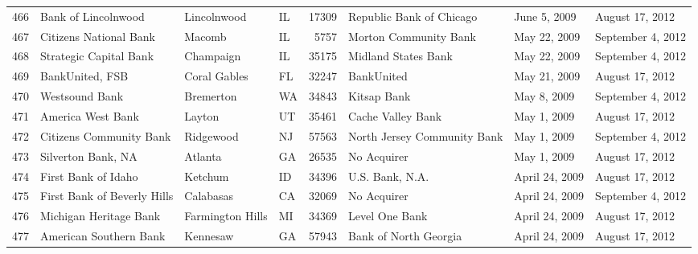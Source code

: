 \begin{tabular}{llllrlll}
466 &                                Bank of Lincolnwood &         Lincolnwood &  IL &  17309 &                           Republic Bank of Chicago &        June 5, 2009 &     August 17, 2012 \\
467 &                             Citizens National Bank &              Macomb &  IL &   5757 &                              Morton Community Bank &        May 22, 2009 &   September 4, 2012 \\
468 &                             Strategic Capital Bank &           Champaign &  IL &  35175 &                                Midland States Bank &        May 22, 2009 &   September 4, 2012 \\
469 &                                    BankUnited, FSB &        Coral Gables &  FL &  32247 &                                         BankUnited &        May 21, 2009 &     August 17, 2012 \\
470 &                                     Westsound Bank &           Bremerton &  WA &  34843 &                                        Kitsap Bank &         May 8, 2009 &   September 4, 2012 \\
471 &                                  America West Bank &              Layton &  UT &  35461 &                                  Cache Valley Bank &         May 1, 2009 &     August 17, 2012 \\
472 &                            Citizens Community Bank &           Ridgewood &  NJ &  57563 &                        North Jersey Community Bank &         May 1, 2009 &   September 4, 2012 \\
473 &                                 Silverton Bank, NA &             Atlanta &  GA &  26535 &                                        No Acquirer &         May 1, 2009 &     August 17, 2012 \\
474 &                                First Bank of Idaho &             Ketchum &  ID &  34396 &                                    U.S. Bank, N.A. &      April 24, 2009 &     August 17, 2012 \\
475 &                        First Bank of Beverly Hills &           Calabasas &  CA &  32069 &                                        No Acquirer &      April 24, 2009 &   September 4, 2012 \\
476 &                             Michigan Heritage Bank &    Farmington Hills &  MI &  34369 &                                     Level One Bank &      April 24, 2009 &     August 17, 2012 \\
477 &                             American Southern Bank &            Kennesaw &  GA &  57943 &                              Bank of North Georgia &      April 24, 2009 &     August 17, 2012 \\

\end{tabular}
